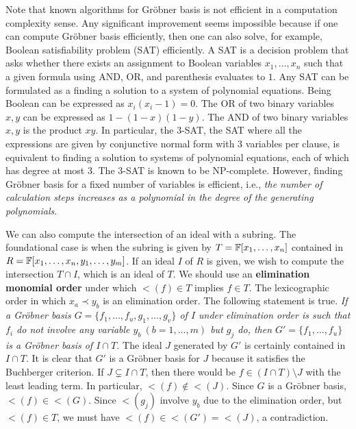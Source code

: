 Note that known algorithms for Gr\"obner basis is not efficient in a computation complexity sense.
Any significant improvement seems impossible because if one can compute Gr\"obner basis efficiently,
then one can also solve, for example, Boolean satisfiability problem (SAT) efficiently.
A SAT is a decision problem that asks whether there exists an assignment to Boolean variables $x_1,\ldots,x_n$
such that a given formula using AND, OR, and parenthesis evaluates to $1$.
Any SAT can be formulated as a finding a solution to a system of polynomial equations.
Being Boolean can be expressed as $x_i(x_i-1) = 0$.
The OR of two binary variables $x,y$ can be expressed as $1-(1-x)(1-y)$.
The AND of two binary variables $x,y$ is the product $xy$.
In particular, the 3-SAT, the SAT where all the expressions are given by conjunctive normal form with 3 variables per clause,
is equivalent to finding a solution to systems of polynomial equations, each of which has degree at most 3.
The 3-SAT is known to be NP-complete.
However, finding Gr\"obner basis for a fixed number of variables is efficient,
i.e., {\em the number of calculation steps increases as a polynomial in the degree of the generating polynomials}.


We can also compute the intersection of an ideal with a subring.
The foundational case is when the subring is given by $T = \mathbb{F}[x_1,\ldots,x_n]$
contained in $R = \mathbb{F}[x_1,\ldots,x_n,y_1,\ldots,y_m]$.
If an ideal $I$ of $R$ is given, we wish to compute the intersection $T \cap I$,
which is an ideal of $T$.
We should use an {\bf elimination monomial order} under which $\lt(f) \in T$ implies $f \in T$.
The lexicographic order in which $x_a \prec y_b$ is an elimination order.
The following statement is true.
{\em If a Gr\"obner basis $G=\{f_1,\ldots,f_u,g_1,\ldots,g_v\}$ of $I$ under elimination order
is such that $f_i$ do not involve any variable $y_b~(b=1,\ldots,m)$ but $g_j$ do,
then $G' = \{f_1,\ldots,f_u\}$ is a Gr\"obner basis of $I \cap T$.}
The ideal $J$ generated by $G'$ is certainly contained in $I \cap T$.
It is clear that $G'$ is a Gr\"obner basis for $J$ because it satisfies the Buchberger criterion.
If $J \subsetneq I \cap T$, then there would be $f \in (I \cap T) \setminus J$ with the least leading term.
In particular, $\lt(f) \notin \lt(J)$.
Since $G$ is a Gr\"obner basis, $\lt(f) \in \lt(G)$.
Since $\lt(g_j)$ involve $y_b$ due to the elimination order, but $\lt(f) \in T$,
we must have $\lt(f) \in \lt(G') = \lt(J)$, a contradiction.


